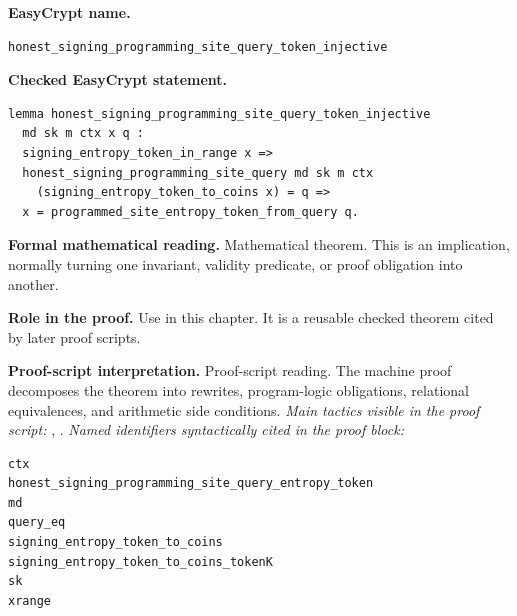 \begin{formaltheorem}
\noindent\textbf{EasyCrypt name.}
\begin{lstlisting}[language=EasyCrypt,basicstyle=\ttfamily\scriptsize]
honest_signing_programming_site_query_token_injective
\end{lstlisting}
\noindent\textbf{Checked EasyCrypt statement.}
\begin{lstlisting}[language=EasyCrypt,basicstyle=\ttfamily\scriptsize]
lemma honest_signing_programming_site_query_token_injective
  md sk m ctx x q :
  signing_entropy_token_in_range x =>
  honest_signing_programming_site_query md sk m ctx
    (signing_entropy_token_to_coins x) = q =>
  x = programmed_site_entropy_token_from_query q.
\end{lstlisting}
\noindent\textbf{Formal mathematical reading.}
Mathematical theorem. This is an implication, normally turning one invariant, validity predicate, or proof obligation into another.

\noindent\textbf{Role in the proof.}
Use in this chapter. It is a reusable checked theorem cited by later proof scripts.

\noindent\textbf{Proof-script interpretation.}
Proof-script reading. The machine proof decomposes the theorem into rewrites, program-logic obligations, relational equivalences, and arithmetic side conditions.
\emph{Main tactics visible in the proof script:} , .
\emph{Named identifiers syntactically cited in the proof block:}
\begin{lstlisting}[language=EasyCrypt,basicstyle=\ttfamily\scriptsize]
ctx
honest_signing_programming_site_query_entropy_token
md
query_eq
signing_entropy_token_to_coins
signing_entropy_token_to_coins_tokenK
sk
xrange
\end{lstlisting}

\end{formaltheorem}

